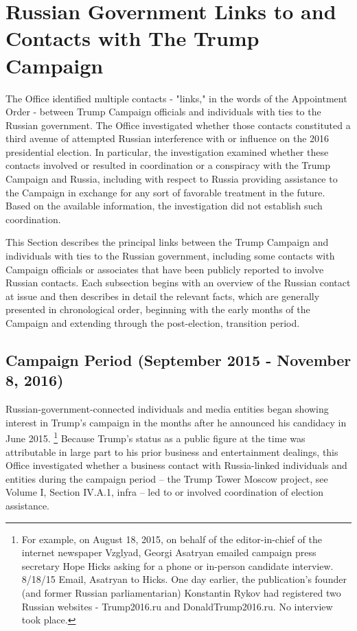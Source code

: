 \section{Russian Government Links to and Contacts with The Trump Campaign}

The Office identified multiple contacts - "links," in the words of the Appointment Order - between Trump Campaign officials and individuals with ties to the Russian government.
The Office investigated whether those contacts constituted a third avenue of attempted Russian interference with or influence on the 2016 presidential election.
In particular, the investigation examined whether these contacts involved or resulted in coordination or a conspiracy with the Trump Campaign and Russia, including with respect to Russia providing assistance to the Campaign in exchange for any sort of favorable treatment in the future.
Based on the available information, the investigation did not establish such coordination.

This Section describes the principal links between the Trump Campaign and individuals with ties to the Russian government, including some contacts with Campaign officials or associates that have been publicly reported to involve Russian contacts.
Each subsection begins with an overview of the Russian contact at issue and then describes in detail the relevant facts, which are generally presented in chronological order, beginning with the early months of the Campaign and extending through the post-election, transition period.

\subsection{Campaign Period (September 2015 - November 8, 2016)}

Russian-government-connected individuals and media entities began showing interest in Trump's campaign in the months after he announced his candidacy in June 2015.%
\footnote{For example, on August 18, 2015, on behalf of the editor-in-chief of the internet newspaper Vzglyad, Georgi Asatryan emailed campaign press secretary Hope Hicks asking for a phone or in-person candidate interview.
8/18/15 Email, Asatryan to Hicks.
One day earlier, the publication's founder (and former Russian parliamentarian) Konstantin Rykov had registered two Russian websites - Trump2016.ru and DonaldTrump2016.ru.
No interview took place.}
Because Trump's status as a public figure at the time was attributable in large part to his prior business and entertainment dealings, this Office investigated whether a business contact with Russia-linked individuals and entities during the campaign period -- the Trump Tower Moscow project, see Volume I, Section IV.A.1, infra -- led to or involved coordination of election assistance.

